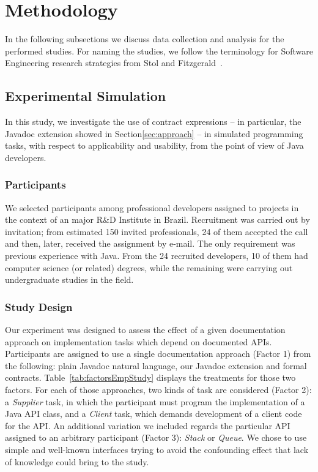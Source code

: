 \section{Methodology}
\label{sec:researchDesign}

In the following subsections we discuss data collection and analysis for the performed studies. For naming the studies, we follow the terminology for Software Engineering research strategies from Stol and Fitzgerald~\cite{Stol2015}.





\subsection{Experimental Simulation}
\label{sec:experiment}

In this study, we investigate the use of contract expressions -- in particular, the Javadoc extension showed in Section\ref{sec:approach} -- in simulated programming tasks, with respect to applicability and usability, from the point of view of Java developers. 

\subsubsection{Participants}
\label{sec:expPart}

We selected participants among professional developers assigned to projects in the context of an major R\&D Institute in Brazil. Recruitment was carried out by invitation; from estimated 150 invited professionals, 24 of them accepted the call and then, later, received the assignment by e-mail. The only requirement was previous experience with Java. From the 24 recruited developers, 10 of them had computer science (or related) degrees, while the remaining were carrying out undergraduate studies in the field. 

\subsubsection{Study Design}
\label{sec:studyDesign}

Our experiment was designed to assess the effect of a given documentation approach on implementation tasks which depend on documented APIs. 
Participants are assigned to use a single documentation approach (Factor 1) from the following: plain Javadoc natural language, our Javadoc extension and formal contracts. Table~\ref{tab:factorsEmpStudy} displays the treatments for those two factors.
For each of those approaches, two kinds of task are considered (Factor 2): a \textit{Supplier} task, in which the participant must program the implementation of a Java API class, and a \textit{Client} task, which demands development of a client code for the API.
An additional variation we included regards the particular API assigned to an arbitrary participant (Factor 3): \textit{Stack} or \textit{Queue}. We chose to use simple and well-known interfaces trying to avoid the confounding effect that lack of knowledge could bring to the study.


